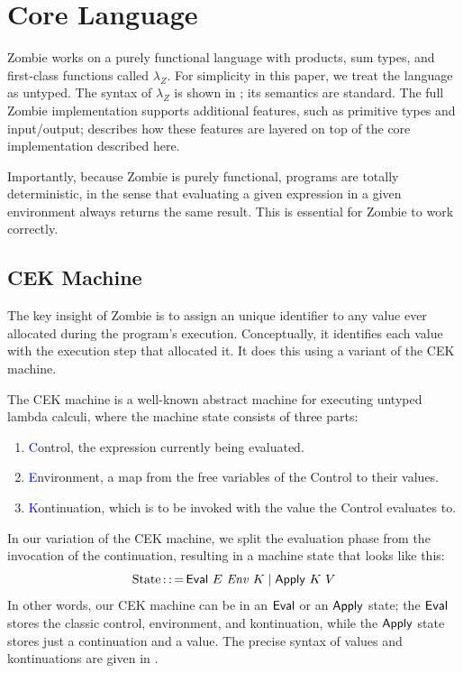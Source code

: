 \section{Core Language}	

Zombie works on a purely functional language with products, sum types,
and first-class functions called $\lambda_Z$. For simplicity in this
paper, we treat the language as untyped. The syntax of $\lambda_Z$ is
shown in ; its semantics are standard. The full
Zombie implementation supports additional features, such as primitive
types and input/output;  describes how these features
are layered on top of the core implementation described here.

Importantly, because Zombie is purely functional, programs are totally
deterministic, in the sense that evaluating a given expression in a
given environment always returns the same result. This is essential
for Zombie to work correctly.

\subsection{CEK Machine}

The key insight of Zombie is to assign an unique identifier to any
value ever allocated during the program's execution. Conceptually, it
identifies each value with the execution step that allocated it. It
does this using a variant of the CEK machine.

The CEK machine is a well-known abstract machine for executing untyped
lambda calculi, where the machine state consists of three parts:

\begin{enumerate}
	\item \textcolor{blue}{C}ontrol, the expression currently being evaluated.
	\item \textcolor{blue}{E}nvironment,
          a map from the free variables of the Control to their values.
	\item \textcolor{blue}{K}ontinuation, which is to be invoked
          with the value the Control evaluates to.
\end{enumerate}


In our variation of the CEK machine, we split the evaluation phase
from the invocation of the continuation, resulting in a machine state
that looks like this:
\[
\text{State} \operatorname{::=} \text{\textsf{Eval}}~E~\mathit{Env}~K \mid \text{\textsf{Apply}}~K~V
\]
In other words, our CEK machine can be in an $\text{\textsf{Eval}}$ or an $\text{\textsf{Apply}}$
state; the $\text{\textsf{Eval}}$ stores the classic control, environment, and
kontinuation, while the $\text{\textsf{Apply}}$ state stores just a continuation and
a value. The precise syntax of values and kontinuations are given in
.

